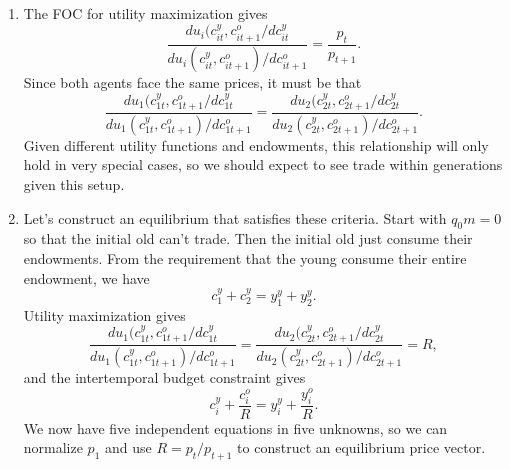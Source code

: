 \documentclass[11pt]{article}
\begin{document}
\begin{enumerate}[label=\alph*)]
\item
The FOC for utility maximization gives
\[
\frac{du_i(c_{it}^y, c_{it+1}^o/dc_{it}^y}{du_i(c_{it}^y, c_{it+1}^o)/dc_{it + 1}^o} = \frac{p_t}{p_{t + 1}}.
\]
Since both agents face the same prices, it must be that 
\[
\frac{du_1(c_{1t}^y, c_{1t+1}^o/dc_{1t}^y}{du_1(c_{1t}^y, c_{1t+1}^o)/dc_{1t + 1}^o} =\frac{du_2(c_{2t}^y, c_{2t+1}^o/dc_{2t}^y}{du_2(c_{2t}^y, c_{2t+1}^o)/dc_{2t + 1}^o}.
\]
Given different utility functions and endowments, this relationship will only hold in very special cases, so we should expect to see trade within generations given this setup.

\item
Let's construct an equilibrium that satisfies these criteria. Start with \(q_0 m = 0\) so that the initial old can't trade. Then the initial old just consume their endowments. From the requirement that the young consume their entire endowment, we have
\[
c_1^y + c_2^y = y_1^y + y_2^y.
\]
Utility maximization gives
\[
\frac{du_1(c_{1t}^y, c_{1t+1}^o/dc_{1t}^y}{du_1(c_{1t}^y, c_{1t+1}^o)/dc_{1t + 1}^o} =\frac{du_2(c_{2t}^y, c_{2t+1}^o/dc_{2t}^y}{du_2(c_{2t}^y, c_{2t+1}^o)/dc_{2t + 1}^o} = R,
\]
and the intertemporal budget constraint gives
\[
c_i^y + \frac{c_i^o}{R} = y_i^y + \frac{y_i^o}{R}.
\]
We now have five independent equations in five unknowns, so we can normalize \(p_1\) and use \(R = p_t / p_{t+1}\) to construct an equilibrium price vector.


\end{enumerate}
\end{document}
